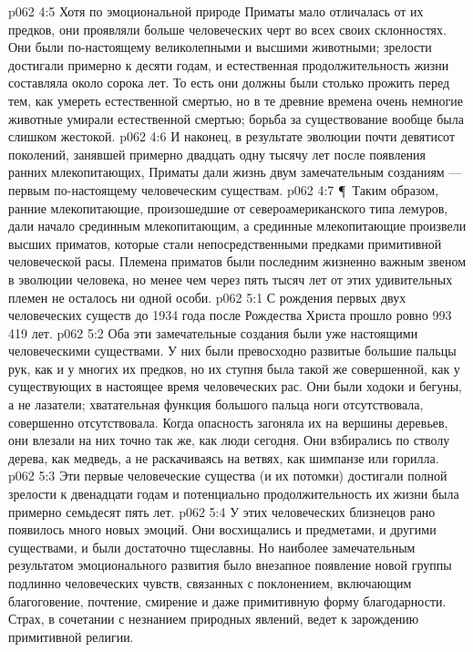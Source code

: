 \vs p062 4:5 Хотя по эмоциональной природе Приматы мало отличалась от их предков, они проявляли больше человеческих черт во всех своих склонностях. Они были по\hyp{}настоящему великолепными и высшими животными; зрелости достигали примерно к десяти годам, и естественная продолжительность жизни составляла около сорока лет. То есть они должны были столько прожить перед тем, как умереть естественной смертью, но в те древние времена очень немногие животные умирали естественной смертью; борьба за существование вообще была слишком жестокой.
\vs p062 4:6 И наконец, в результате эволюции почти девятисот поколений, занявшей примерно двадцать одну тысячу лет после появления ранних млекопитающих, Приматы  дали жизнь двум замечательным созданиям --- первым по\hyp{}настоящему человеческим существам.
\vs p062 4:7 \P\ Таким образом, ранние млекопитающие, произошедшие от североамериканского типа лемуров, дали начало срединным млекопитающим, а срединные млекопитающие произвели высших приматов, которые стали непосредственными предками примитивной человеческой расы. Племена приматов были последним жизненно важным звеном в эволюции человека, но менее чем через пять тысяч лет от этих удивительных племен не осталось ни одной особи.
\vs p062 5:1 С рождения первых двух человеческих существ до 1934 года после Рождества Христа прошло ровно 993 419 лет.
\vs p062 5:2 Оба эти замечательные создания были уже настоящими человеческими существами. У них были превосходно развитые большие пальцы рук, как и у многих их предков, но их ступня была такой же совершенной, как у существующих в настоящее время человеческих рас. Они были ходоки и бегуны, а не лазатели; хватательная функция большого пальца ноги отсутствовала, совершенно отсутствовала. Когда опасность загоняла их на вершины деревьев, они влезали на них точно так же, как люди сегодня. Они взбирались по стволу дерева, как медведь, а не раскачиваясь на ветвях, как шимпанзе или горилла.
\vs p062 5:3 Эти первые человеческие существа (и их потомки) достигали полной зрелости к двенадцати годам и потенциально продолжительность их жизни была примерно семьдесят пять лет.
\vs p062 5:4 У этих человеческих близнецов рано появилось много новых эмоций. Они восхищались и предметами, и другими существами, и были достаточно тщеславны. Но наиболее замечательным результатом эмоционального развития было внезапное появление новой группы подлинно человеческих чувств, связанных с поклонением, включающим благоговение, почтение, смирение и даже примитивную форму благодарности. Страх, в сочетании с незнанием природных явлений, ведет к зарождению примитивной религии.
